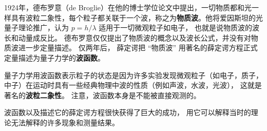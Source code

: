 1924年，德布罗意（de Broglie）在他的博士学位论文中提出，一切物质都和光一样具有波粒二象性，每个粒子都关联于一个波，称之为\textbf{物质波}。他将爱因斯坦的光量子理论推广，认为 $p=h/\lambda$ 适用于一切微观粒子如电子， 也就是说物质波的波长和动量成反比。 德布罗意仅仅提出了物质波的概念以及波长公式，并没有对物质波进一步定量描述。 仅两年后， 薛定谔把 “物质波” 用著名的薛定谔方程正式定量描述为量子力学的\textbf{波函数}。

量子力学用波函数表示粒子的状态是因为许多实验发现微观粒子（如电子，质子，中子）在运动时具有一些经典物理中波的性质（例如声波，水波，光波）， 这就是著名的\textbf{波粒二象性}。 注意，波函数本身是不能被直接观测的。

波函数以及描述它的薛定谔方程很快获得了巨大的成功， 用它可以解释当时的理论无法解释的许多现象和测量结果。
